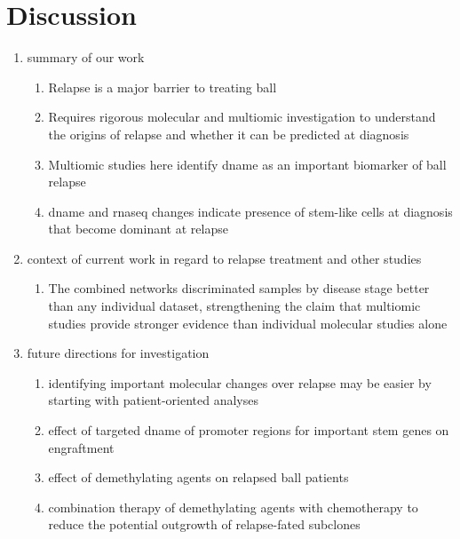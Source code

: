 \section{Discussion}

\begin{enumerate}
  \item summary of our work
  \begin{enumerate}
    \item Relapse is a major barrier to treating \gls{ball}
    \item Requires rigorous molecular and multiomic investigation to understand the origins of relapse and whether it can be predicted at diagnosis
    \item Multiomic studies here identify \gls{dname} as an important biomarker of \gls{ball} relapse
    \item \gls{dname} and \gls{rnaseq} changes indicate presence of stem-like cells at diagnosis that become dominant at relapse
  \end{enumerate}
  \item context of current work in regard to relapse treatment and other studies
  \begin{enumerate}
    \item The combined networks discriminated samples by disease stage better than any individual dataset, strengthening the claim that multiomic studies provide stronger evidence than individual molecular studies alone
  \end{enumerate}
  \item future directions for investigation
  \begin{enumerate}
    \item identifying important molecular changes over relapse may be easier by starting with patient-oriented analyses
    \item effect of targeted \gls{dname} of promoter regions for important stem genes on engraftment
    \item effect of demethylating agents on relapsed \gls{ball} patients
    \item combination therapy of demethylating agents with chemotherapy to reduce the potential outgrowth of relapse-fated subclones
  \end{enumerate}
\end{enumerate}